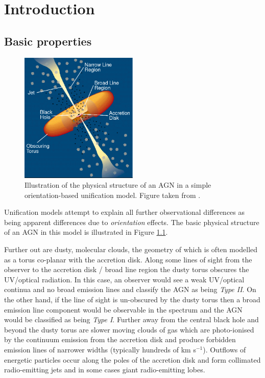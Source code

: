 
\chapter{Introduction}
\label{ch:intro}

\section{Basic properties}

\begin{figure}
  \centering
  \includegraphics[width=0.5\textwidth]{figures/chapter05/urry_model}
  \caption[{Illustration of the physical structure of an AGN in a simple orientation-based unification model.}]{Illustration of the physical structure of an AGN in a simple orientation-based unification model. Figure taken from \citet{urry95}.}
  \label{fig:agnmodel}
\end{figure}

Unification models attempt to explain all further observational differences as being apparent differences due to {\it orientation} effects. 
The basic physical structure of an AGN in this model is illustrated in Figure \ref{fig:agnmodel}. 

Further out are dusty, molecular clouds, the geometry of which is often modelled as a torus co-planar with the accretion disk. 
Along some lines of sight from the observer to the accretion disk / broad line region the dusty torus obscures the UV/optical radiation. 
In this case, an observer would see a weak UV/optical continua and no broad emission lines and classify the AGN as being {\it Type II}. 
On the other hand, if the line of sight is un-obscured by the dusty torus then a broad emission line component would be observable in the spectrum and the AGN would be classified as being {\it Type I}. 
Further away from the central black hole and beyond the dusty torus are slower moving clouds of gas which are photo-ionised by the continuum emission from the accretion disk and produce forbidden emission lines of narrower widths (typically hundreds of km s$^{-1}$). 
Outflows of energetic particles occur along the poles of the accretion disk and form collimated radio-emitting jets and in some cases giant radio-emitting lobes. 

